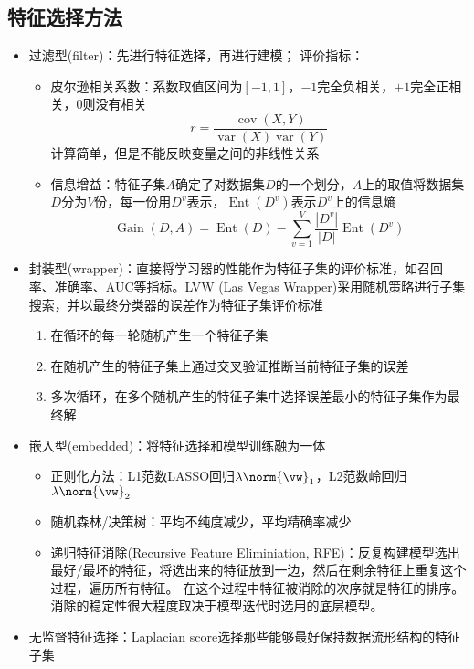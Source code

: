 \subsection{特征选择方法}
\begin{itemize}
	\item 过滤型(filter)：先进行特征选择，再进行建模；
	评价指标：
	\begin{itemize}
		\item 皮尔逊相关系数：系数取值区间为$[-1,1]$，$-1$完全负相关，$+1$完全正相关，$0$则没有相关
		\[r=\frac{\mathop{cov}(X,Y)}{\mathop{var}(X)\mathop{var}(Y)}\]
		计算简单，但是不能反映变量之间的非线性关系
		\item 信息增益：特征子集$A$确定了对数据集$D$的一个划分，$A$上的取值将数据集$D$分为$V$份，每一份用$D^v$表示，$\mathop{Ent}(D^v)$表示$D^v$上的信息熵
		\[\mathop{Gain}(D,A)=\mathop{Ent}(D)-\sum_{v=1}^V\frac{|D^v|}{|D|}\mathop{Ent}(D^v)\]
	\end{itemize}
	\item 封装型(wrapper)：直接将学习器的性能作为特征子集的评价标准，如召回率、准确率、AUC等指标。LVW (Las Vegas Wrapper)采用随机策略进行子集搜索，并以最终分类器的误差作为特征子集评价标准
	\begin{enumerate}
		\item 在循环的每一轮随机产生一个特征子集
		\item 在随机产生的特征子集上通过交叉验证推断当前特征子集的误差
		\item 多次循环，在多个随机产生的特征子集中选择误差最小的特征子集作为最终解
	\end{enumerate}
	\item 嵌入型(embedded)：将特征选择和模型训练融为一体
	\begin{itemize}
		\item 正则化方法：L1范数LASSO回归$\lambda\norm{\vw}_1$，L2范数岭回归$\lambda\norm{\vw}_2$
		\item 随机森林/决策树：平均不纯度减少，平均精确率减少
		\item 递归特征消除(Recursive Feature Eliminiation, RFE)：反复构建模型选出最好/最坏的特征，将选出来的特征放到一边，然后在剩余特征上重复这个过程，遍历所有特征。
		在这个过程中特征被消除的次序就是特征的排序。
		消除的稳定性很大程度取决于模型迭代时选用的底层模型。
	\end{itemize}
	\item 无监督特征选择：Laplacian score选择那些能够最好保持数据流形结构的特征子集
\end{itemize}